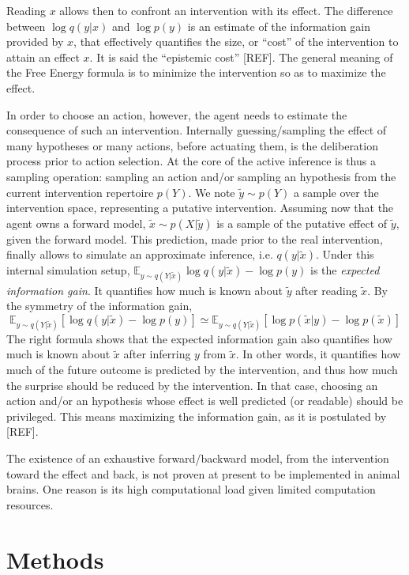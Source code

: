 \documentclass[runningheads]{llncs}
\begin{document}
Reading $x$ allows then to confront an intervention with its effect. The difference between $\log q(y|x)$ and $\log p(y)$ is an estimate of the information gain provided by $x$, that effectively quantifies the size, or ``cost'' of the intervention to attain an effect $x$. It is said the ``epistemic cost'' [REF]. The general meaning of the Free Energy formula is to minimize the intervention so as to maximize the effect.

In order to choose an action, however, the agent needs to estimate the consequence of such an intervention. Internally guessing/sampling the effect of many hypotheses or many actions, before actuating them, is the deliberation process prior to action selection. 
At the core of the active inference is thus a sampling operation: sampling an action and/or sampling an hypothesis from the current intervention repertoire $p(Y)$.  We note $\tilde{y}\sim p(Y)$ a sample over the  intervention space, representing a putative intervention. Assuming now that the agent owns a forward model, $\tilde{x}\sim p(X|\tilde{y})$ is a sample of the putative effect of $\tilde{y}$, given the forward model.
This prediction, made prior to the real intervention, finally allows to simulate an approximate inference, i.e. $q(y|\tilde{x})$. Under this internal simulation setup, $\mathbb{E}_{y \sim q(Y|\tilde{x})}\log q(y|\tilde{x}) - \log p(y)$ is the \emph{expected information gain}. It quantifies how much is known about $\tilde{y}$ after reading $\tilde{x}$. By the symmetry of the information gain, 
$$\mathbb{E}_{y \sim q(Y|\tilde{x})}[\log q(y|\tilde{x}) - \log p(y)]
\simeq \mathbb{E}_{y \sim q(Y|\tilde{x})}[\log p(\tilde{x}|y) - \log p(\tilde{x})]$$
The right formula shows that the expected information gain also quantifies how much is known about $\tilde{x}$ after inferring $y$ from  $\tilde{x}$. 
In other words, it quantifies how much of the future outcome is predicted by the intervention, and thus how much the surprise should be reduced by the intervention. In that case, choosing an action and/or an hypothesis whose effect is well predicted (or readable) should be privileged. This means maximizing the information gain, as it is postulated by [REF]. 

The existence of an exhaustive forward/backward model, from the intervention toward the effect and back, is not proven at present to be implemented in animal brains. One reason is its high computational load given  limited computation resources.  

\section{Methods}



%
%
%


\end{document}
